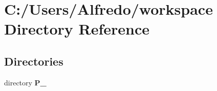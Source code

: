 \section{C\+:/\+Users/\+Alfredo/workspace Directory Reference}
\label{dir_3fd9d1d54eee551075ac8efcfb532615}
\subsection*{Directories}
\begin{DoxyCompactItemize}
\item 
directory {\bf P\+\_}
\end{DoxyCompactItemize}
